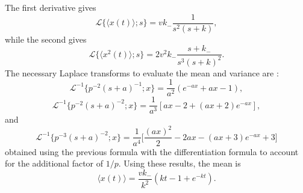 \documentclass[11pt]{article}
\newcommand\be{\begin{equation}} %
\newcommand\ee{\end{equation}}   %
\newcommand\bra{\langle}
\newcommand\ket{\rangle}
\newcommand\El{\mathcal{L}}
\begin{document}
The first derivative gives 
\be \El\{\bra x(t) \ket;s\} = vk_- \frac{1}{s^2(s+k)},\ee
while the second gives 
\be \El\{\bra x^2(t) \ket ; s\} = 2 v^2 k_- \frac{s+k_-}{s^3(s+k)^2}. \ee
The necessary Laplace transforms to evaluate the mean and variance are \citep[][2.1.2.33]{Prudnikov1986}:
\be \El^{-1}\Big\{p^{-2}(s+a)^{-1};x\Big\} = \frac{1}{a^2}(e^{-ax}+ax-1),\ee
\citep[][2.1.2.49]{Prudnikov1986}
\be \El^{-1}\Big\{p^{-2}(s+a)^{-2};x\Big\} = \frac{1}{a^3}[ax - 2 + (ax+2)e^{-ax}],\ee
and 
\be \El^{-1}\Big\{p^{-3}(s+a)^{-2};x\Big\} = \frac{1}{a^4}\Big[\frac{(ax)^2}{2} - 2ax - (ax+3)e^{-ax} + 3\Big] \ee
obtained using the previous formula with the differentiation formula to account for the additional factor of $1/p$.
Using these results, the mean is 
\be \bra x(t) \ket = \frac{vk_-}{k^2}(kt -1 + e^{-kt}).\ee

\end{document}
